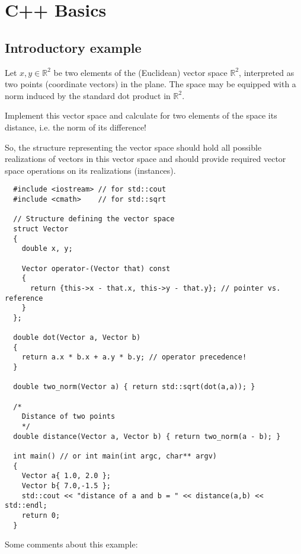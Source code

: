 \chapter{C++ Basics\label{sec:basics}}
\section{Introductory example\label{sec:introductory-example}}

Let $x,y\in \mathbb{R}^2$ be two elements of the (Euclidean) vector space $\mathbb{R}^2$, interpreted as
two points (coordinate vectors) in the plane. The space may be equipped with a norm induced by the standard
dot product in $\mathbb{R}^2$.

Implement this vector space and calculate for two elements of the space its distance, i.e. the norm of its difference!

So, the structure representing the vector space should hold all possible realizations of vectors in this vector space
and should provide required vector space operations on its realizations (instances).


\begin{verbatim}
  #include <iostream> // for std::cout
  #include <cmath>    // for std::sqrt

  // Structure defining the vector space
  struct Vector
  {
    double x, y;

    Vector operator-(Vector that) const
    {
      return {this->x - that.x, this->y - that.y}; // pointer vs. reference
    }
  };

  double dot(Vector a, Vector b)
  {
    return a.x * b.x + a.y * b.y; // operator precedence!
  }

  double two_norm(Vector a) { return std::sqrt(dot(a,a)); }

  /*
    Distance of two points
    */
  double distance(Vector a, Vector b) { return two_norm(a - b); }

  int main() // or int main(int argc, char** argv)
  {
    Vector a{ 1.0, 2.0 };
    Vector b{ 7.0,-1.5 };
    std::cout << "distance of a and b = " << distance(a,b) << std::endl;
    return 0;
  }
\end{verbatim}

Some comments about this example:

